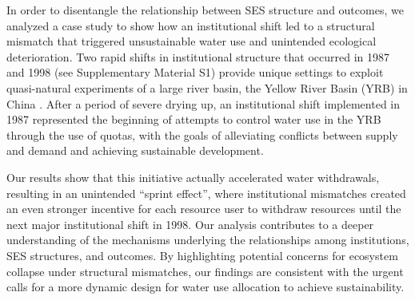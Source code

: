 \documentclass{article}
\begin{document}
In order to disentangle the relationship between SES structure and outcomes, we analyzed a case study to show how an institutional shift led to a structural mismatch that triggered unsustainable water use and unintended ecological deterioration. Two rapid shifts in institutional structure that occurred in 1987 and 1998 (see Supplementary Material S1) provide unique settings to exploit quasi-natural experiments of a large river basin, the Yellow River Basin (YRB) in China \cite{xiaDevelopmentWaterAllocation2012}. After a period of severe drying up, an institutional shift implemented in 1987 represented the beginning of attempts to control water use in the YRB through the use of quotas, with the goals of alleviating conflicts between supply and demand and achieving sustainable development.

Our results show that this initiative actually accelerated water withdrawals, resulting in an unintended “sprint effect”, where institutional mismatches created an even stronger incentive for each resource user to withdraw resources until the next major institutional shift in 1998. Our analysis contributes to a deeper understanding of the mechanisms underlying the relationships among institutions, SES structures, and outcomes. By highlighting potential concerns for ecosystem collapse under structural mismatches, our findings are consistent with the urgent calls for a more dynamic design for water use allocation to achieve sustainability.
\end{document}
